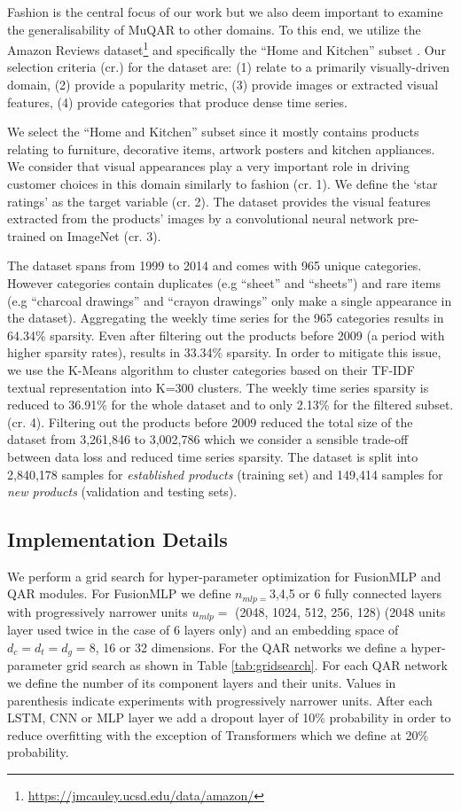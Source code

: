 \documentclass{article}
\begin{document}
Fashion is the central focus of our work but we also deem important to examine the generalisability of MuQAR to other domains. 
To this end, we utilize the Amazon Reviews dataset\footnote{\url{https://jmcauley.ucsd.edu/data/amazon/}} and specifically the ``Home and Kitchen'' subset \cite{mcauley2015image}. 
Our selection criteria (cr.) for the dataset are: 
(1) relate to a primarily visually-driven domain, 
(2) provide a popularity metric, 
(3) provide images or extracted visual features,
(4) provide categories that produce dense time series.

We select the ``Home and Kitchen'' subset since it mostly contains products relating to furniture, decorative items, artwork posters and kitchen appliances.
We consider that visual appearances play a very important role in driving customer choices in this domain similarly to fashion (cr. 1).
We define the ‘star ratings’ as the target variable (cr. 2). 
The dataset provides the visual features extracted from the products' images by a convolutional neural network pre-trained on ImageNet (cr. 3).

The dataset spans from 1999 to 2014 and comes with 965 unique categories. However categories contain duplicates (e.g ``sheet'' and ``sheets'') and rare items (e.g ``charcoal drawings'' and ``crayon drawings'' only make a single appearance in the dataset). 
Aggregating the weekly time series for the 965 categories results in 64.34\% sparsity.
Even after filtering out the products before 2009 (a period with higher sparsity rates), results in 33.34\% sparsity. 
In order to mitigate this issue, we use the K-Means algorithm to cluster categories based on their TF-IDF textual representation into K=300 clusters. 
The weekly time series sparsity is reduced to 36.91\% for the whole dataset and to only 2.13\% for the filtered subset. (cr. 4). 
Filtering out the products before 2009 reduced the total size of the dataset from 3,261,846 to 3,002,786 which we consider a sensible trade-off between data loss and reduced time series sparsity. 
The dataset is split into 2,840,178 samples for \textit{established products} (training set) and 149,414 samples for \textit{new products} (validation and testing sets).

\subsection{Implementation Details}

We perform a grid search for hyper-parameter optimization for FusionMLP and QAR modules.
For FusionMLP we define $n_{mlp=}$3,4,5 or 6 fully connected layers with progressively narrower units $u_{mlp}=$ (2048, 1024, 512, 256, 128) (2048 units layer used twice in the case of 6 layers only) and an embedding space of $d_c=d_t=d_g=$8, 16 or 32 dimensions. 
For the QAR networks we define a hyper-parameter grid search as shown in Table \ref{tab:gridsearch}. For each QAR network we define the number of its component layers and their units. Values in parenthesis indicate experiments with progressively narrower units. 
After each LSTM, CNN or MLP layer we add a dropout layer of 10\% probability in order to reduce overfitting with the exception of Transformers which we define at 20\% probability.
\end{document}
